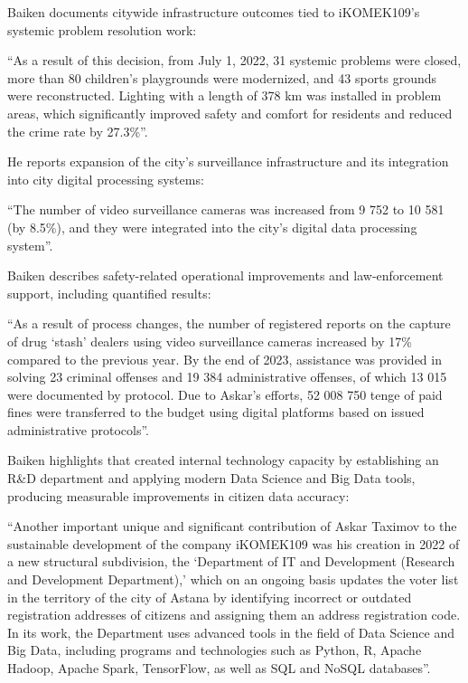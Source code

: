 Baiken documents citywide infrastructure outcomes tied to iKOMEK109’s systemic problem resolution work:
\begin{fullquote}
``As a result of this decision, from July 1, 2022, 31 systemic problems were closed, more than 80 children’s playgrounds were modernized, and 43 sports grounds were reconstructed. Lighting with a length of 378 km was installed in problem areas, which significantly improved safety and comfort for residents and reduced the crime rate by 27.3\%''.
\end{fullquote}

He reports expansion of the city’s surveillance infrastructure and its integration into city digital processing systems:
\begin{fullquote}
``The number of video surveillance cameras was increased from 9 752 to 10 581 (by 8.5\%), and they were integrated into the city’s digital data processing system''.
\end{fullquote}

Baiken describes safety-related operational improvements and law-enforcement support, including quantified results:
\begin{fullquote}
``As a result of process changes, the number of registered reports on the capture of drug `stash' dealers using video surveillance cameras increased by 17\% compared to the previous year. By the end of 2023, assistance was provided in solving 23 criminal offenses and 19 384 administrative offenses, of which 13 015 were documented by protocol. Due to Askar’s efforts, 52 008 750 tenge of paid fines were transferred to the budget using digital platforms based on issued administrative protocols''.
\end{fullquote}

Baiken highlights that \mrl{} created internal technology capacity by establishing an R\&D department and applying modern Data Science and Big Data tools, producing measurable improvements in citizen data accuracy:
\begin{fullquote}
``Another important unique and significant contribution of Askar Taximov to the sustainable development of the company iKOMEK109 was his creation in 2022 of a new structural subdivision, the `Department of IT and Development (Research and Development Department),' which on an ongoing basis updates the voter list in the territory of the city of Astana by identifying incorrect or outdated registration addresses of citizens and assigning them an address registration code. In its work, the Department uses advanced tools in the field of Data Science and Big Data, including programs and technologies such as Python, R, Apache Hadoop, Apache Spark, TensorFlow, as well as SQL and NoSQL databases''.
\end{fullquote}


